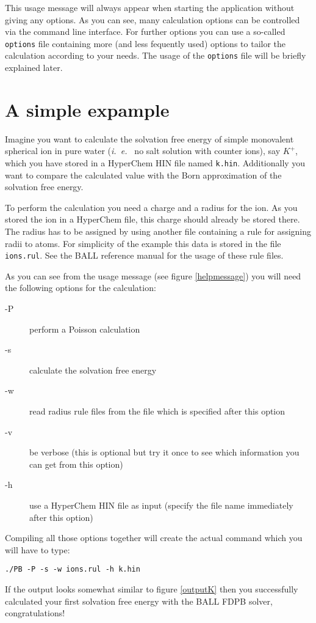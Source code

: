 \documentclass[12pt,twoside,a4paper]{article}
\begin{document}
This usage message will always appear when starting the application without
giving any options. As you can see, many calculation options can be
controlled via the command line interface. For further options you can use
a so-called {\tt options} file containing more (and less fequently used)
options to tailor the calculation according to your needs. The usage of the
{\tt options} file will be briefly explained later.


\section{A simple expample}

Imagine you want to calculate the solvation free energy of simple
monovalent spherical ion in pure water (\textit{i.~e.~} no salt solution
with counter ions), say $K^+$, which you have stored in a HyperChem HIN
file named {\tt k.hin}. Additionally you want to compare the calculated
value with the Born approximation of the solvation free energy.

To perform the calculation you need a charge and a radius for the ion. As
you stored the ion in a HyperChem file, this charge should already be
stored there. The radius has to be assigned by using another file
containing a rule for assigning radii to atoms. For simplicity of the
example this data is stored in the file {\tt ions.rul}. See the BALL
reference manual for the usage of these rule files.

As you can see from the usage message (see figure \ref{helpmessage}) you
will need the following options for the calculation:
\begin{description}
\item[-P] perform a Poisson calculation
\item[-s] calculate the solvation free energy
\item[-w] read radius rule files from the file which is specified after
this option
\item[-v] be verbose (this is optional but try it once to see which
information you can get from this option)
\item[-h] use a HyperChem HIN file as input (specify the file name
immediately after this option)
\end{description}

Compiling all those options together will create the actual command which
you will have to type:
\begin{verbatim}
./PB -P -s -w ions.rul -h k.hin
\end{verbatim}
If the output looks somewhat similar to figure \ref{outputK} then you
successfully calculated your first solvation free energy with the BALL FDPB
solver, congratulations!
\end{document}
